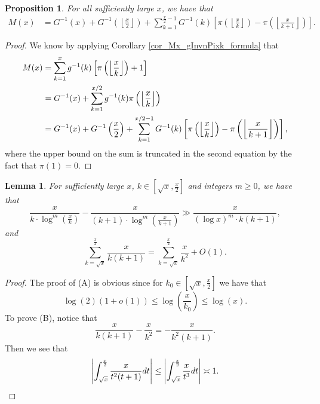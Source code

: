 \documentclass[11pt,reqno,a4letter]{article}
\numberwithin{figure}{section}
\numberwithin{table}{section}
\newcommand{\Floor}[2]{\ensuremath{\left\lfloor \frac{#1}{#2} \right\rfloor}}
\theoremstyle{plain}
\newtheorem{prop}[theorem]{Proposition}
\newtheorem{lemma}[theorem]{Lemma}
\numberwithin{theorem}{section}
\theoremstyle{definition}
\begin{document}
\begin{prop} 
\label{prop_Mx_SBP_IntegralFormula} 
For all sufficiently large $x$, we have that 
\begin{align} 
\label{eqn_pf_tag_v2-restated_v2} 
M(x) & = G^{-1}(x) + G^{-1}\left(\Floor{x}{2}\right) + 
     \sum_{k=1}^{\frac{x}{2}-1} G^{-1}(k) \left[ 
     \pi\left(\Floor{x}{k}\right) - \pi\left(\Floor{x}{k+1}\right) 
     \right]. 
\end{align} 
\end{prop} 
\begin{proof} 
We know by applying Corollary \ref{cor_Mx_gInvnPixk_formula} that 
\begin{align} 
\notag
M(x) & = \sum_{k=1}^{x} g^{-1}(k) \left[\pi\left(\Floor{x}{k}\right)+1\right] \\ 
\notag 
     & = G^{-1}(x) + \sum_{k=1}^{x/2} g^{-1}(k) \pi\left(\Floor{x}{k}\right) \\ 
\notag 
     & = G^{-1}(x) + G^{-1}\left(\frac{x}{2}\right) + 
     \sum_{k=1}^{x/2-1} G^{-1}(k) \left[ 
     \pi\left(\Floor{x}{k}\right) - \pi\left(\Floor{x}{k+1}\right) 
     \right], 
\end{align} 
where the upper bound on the sum is truncated in the second equation 
by the fact that $\pi(1) = 0$. 
\end{proof} 

\begin{lemma}
\label{lemma_PrimePix_ErrorBoundDiffs_SimplifyingConditions_v1} 
For sufficiently large $x$, $k \in \left[\sqrt{x}, \frac{x}{2}\right]$ and 
integers $m \geq 0$, we have that 
\begin{equation} 
\tag{A} 
\frac{x}{k \cdot \log^m\left(\frac{x}{k}\right)} - 
     \frac{x}{(k+1) \cdot \log^m\left(\frac{x}{k+1}\right)}
     \gg \frac{x}{(\log x)^m \cdot k(k+1)}, 
\end{equation} 
and 
\begin{equation} 
\tag{B} 
\sum_{k=\sqrt{x}}^{\frac{x}{2}} \frac{x}{k(k+1)} = 
     \sum_{k=\sqrt{x}}^{\frac{x}{2}} \frac{x}{k^2} + O(1). 
\end{equation} 
\end{lemma} 
\begin{proof} 
The proof of (A) is obvious since for $k_0 \in \left[\sqrt{x}, \frac{x}{2}\right]$ we have that 
\[
\log(2) (1 + o(1)) \leq \log\left(\frac{x}{k_0}\right) \leq \log(x). 
\]
To prove (B), notice that 
\[
\frac{x}{k(k+1)} - \frac{x}{k^2} = -\frac{x}{k^2(k+1)}. 
\]
Then we see that 
\[
\left\lvert \int_{\sqrt{x}}^{\frac{x}{2}} \frac{x}{t^2(t+1)} dt \right\rvert \leq 
     \left\lvert \int_{\sqrt{x}}^{\frac{x}{2}} \frac{x}{t^3} dt \right\rvert \asymp 1. 
     \qedhere 
\]
\end{proof} 
\end{document}
